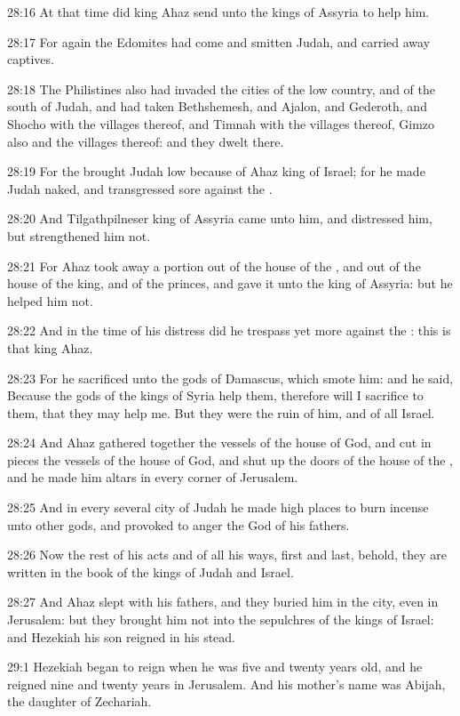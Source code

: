 28:16 At that time did king Ahaz send unto the kings of Assyria to
help him.

28:17 For again the Edomites had come and smitten Judah, and carried
away captives.

28:18 The Philistines also had invaded the cities of the low country,
and of the south of Judah, and had taken Bethshemesh, and Ajalon, and
Gederoth, and Shocho with the villages thereof, and Timnah with the
villages thereof, Gimzo also and the villages thereof: and they dwelt
there.

28:19 For the \LORD brought Judah low because of Ahaz king of Israel;
for he made Judah naked, and transgressed sore against the \LORD.

28:20 And Tilgathpilneser king of Assyria came unto him, and
distressed him, but strengthened him not.

28:21 For Ahaz took away a portion out of the house of the \LORD, and
out of the house of the king, and of the princes, and gave it unto the
king of Assyria: but he helped him not.

28:22 And in the time of his distress did he trespass yet more against
the \LORD: this is that king Ahaz.

28:23 For he sacrificed unto the gods of Damascus, which smote him:
and he said, Because the gods of the kings of Syria help them,
therefore will I sacrifice to them, that they may help me. But they
were the ruin of him, and of all Israel.

28:24 And Ahaz gathered together the vessels of the house of God, and
cut in pieces the vessels of the house of God, and shut up the doors
of the house of the \LORD, and he made him altars in every corner of
Jerusalem.

28:25 And in every several city of Judah he made high places to burn
incense unto other gods, and provoked to anger the \LORD God of his
fathers.

28:26 Now the rest of his acts and of all his ways, first and last,
behold, they are written in the book of the kings of Judah and Israel.

28:27 And Ahaz slept with his fathers, and they buried him in the
city, even in Jerusalem: but they brought him not into the sepulchres
of the kings of Israel: and Hezekiah his son reigned in his stead.

29:1 Hezekiah began to reign when he was five and twenty years old,
and he reigned nine and twenty years in Jerusalem. And his mother's
name was Abijah, the daughter of Zechariah.


